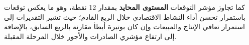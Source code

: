 كما تجاوز مؤشر التوقعات \textbf{المستوى المحايد} بمقدار 12 نقطة، وهو ما يعكس توقعات باستمرار تحسن أداء النشاط الاقتصادي خلال الربع القادم؛ حيث تشير التقديرات إلى استمرار تعافي الإنتاج والمبيعات وإن كان بوتيرة أبطأ مقارنة بالربع السابق، بالإضافة إلى ارتفاع مؤشري الصادرات والأجور خلال المرحلة المقبلة.
